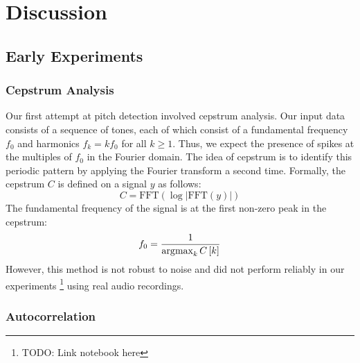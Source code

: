 \section{Discussion}
\label{sec:discussion}

\subsection{Early Experiments}
\label{sec:experiments}

\subsubsection{Cepstrum Analysis}

Our first attempt at pitch detection involved cepstrum analysis. Our input data consists of a sequence of tones, each of which consist of a fundamental frequency $f_0$ and harmonics $f_k = k f_0$ for all $k \geq 1$. Thus, we expect the presence of spikes at the multiples of $f_0$ in the Fourier domain. The idea of cepstrum is to identify this periodic pattern by applying the Fourier transform a second time. Formally, the cepstrum $C$ is defined on a signal $y$ as follows:
$$C = \text{FFT}\left(\log\left|\text{FFT}\left(y\right)\right|\right)$$
The fundamental frequency of the signal is at the first non-zero peak in the cepstrum:
$$f_0 = \frac{1}{\operatorname*{\arg\!\max}_{k} C\left[k\right]}$$
However, this method is not robust to noise and did not perform reliably in our experiments \footnote{TODO: Link notebook here} using real audio recordings.

\subsubsection{Autocorrelation}

